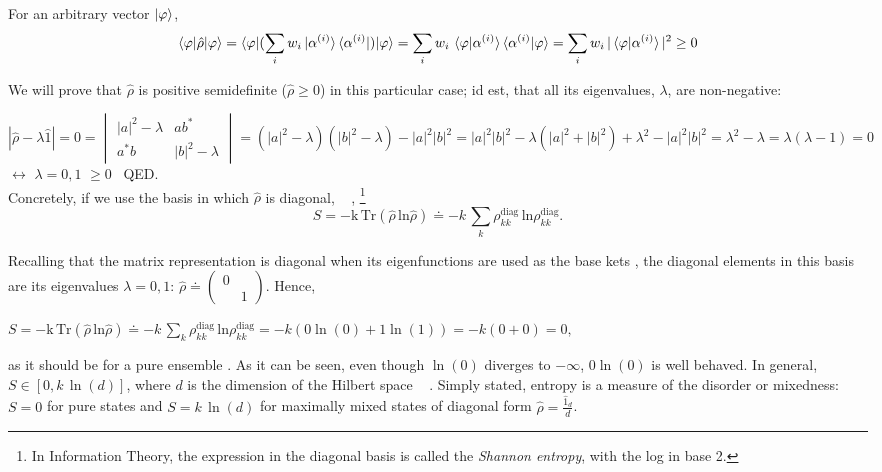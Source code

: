 \documentclass[11pt]{article}
\numberwithin{equation}{section} %
\numberwithin{figure}{section} %
\begin{document}
\begin{appendices}
\begin{enumerate}
For an arbitrary vector $\ket{\varphi}$,  $\,\,\,$ \cite[p.~191, Eq.~(2.156)]{Nielsen}
\begin{equation}
\braket{\varphi|\hat{\rho}|\varphi}=\braket{\varphi|(\sum_iw_i\ket{\alpha^{(i)}}\bra{\alpha^{(i)}})|\varphi}=\sum_iw_i\,\braket{\varphi|\alpha^{(i)}}\braket{\alpha^{(i)}|\varphi}=\sum_iw_i\,|\braket{\varphi|\alpha^{(i)}}|^2\geq 0
\end{equation}


We will prove that $\hat{\rho}$ is positive semidefinite ($\hat{\rho}\geq 0$) in this particular case; id est, that all its eigenvalues, $\lambda$, are non-negative:

$|\hat{\rho}-\lambda\hat{1}|=0=\begin{vmatrix} |a|^2-\lambda&ab^* \\ a^*b&|b|^2-\lambda \end{vmatrix}=(|a|^2-\lambda)(|b|^2-\lambda)-|a|^2|b|^2=|a|^2|b|^2-\lambda(|a|^2+|b|^2)+\lambda^2-|a|^2|b|^2=\lambda^2-\lambda=\lambda(\lambda-1)=0$ $\leftrightarrow$ $\lambda=0,1$ $\geq 0\,\,\,$ QED.\\

Concretely, if we use the basis in which $\hat{\rho}$ is diagonal,  $\,\,\,$  \cite[p.~187 Eq.~(3.4.36)]{Sakurai}, \footnote{In Information Theory, the expression in the diagonal basis is called the \emph{Shannon entropy}, with the log in base 2.}
\begin{equation} \label{Entropy}
S = -\textrm{k}\,\textrm{Tr}(\hat{\rho}\,\textrm{ln}\hat{\rho}) \doteq -k\,\sum_k \rho_{kk}^{\textrm{diag}}\,\textrm{ln}\rho_{kk}^{\textrm{diag}}\textrm{.}
\end{equation}

Recalling that the matrix representation is diagonal when its eigenfunctions are used as the base kets \cite[p.~22, l.~3-5 \& p.~36, l.~5-7]{Sakurai}, the diagonal elements in this basis are its eigenvalues $\lambda=0,1$: $\hat{\rho}\doteq\begin{pmatrix} 0& \\ &1 \end{pmatrix}$. Hence,

$S = -\textrm{k}\,\textrm{Tr}(\hat{\rho}\,\textrm{ln}\hat{\rho}) \doteq -k\,\sum_k \rho_{kk}^{\textrm{diag}}\,\textrm{ln}\rho_{kk}^{\textrm{diag}}=-k(0\ln(0)+1\ln(1))=-k(0+0)=0\textrm{,}$

as it should be for a pure ensemble \cite[p.~187, Eq.~(3.4.38)]{Sakurai}. As it can be seen, even though $\ln(0)$ diverges to $-\infty$, $0\ln(0)$ is well behaved. In general, $S\in[0,k\,\ln(d)]$, where $d$ is the dimension of the Hilbert space  $\,\,\,$  \cite[p.~187, Eq.~(3.4.37)]{Sakurai}. Simply stated, entropy is a measure of the disorder or mixedness: $S=0$ for pure states and $S=k\,\ln(d)$ for maximally mixed states of diagonal form $\hat{\rho}=\frac{\hat{1}_d}{d}$.




\end{enumerate}
\end{appendices}
\end{document}

